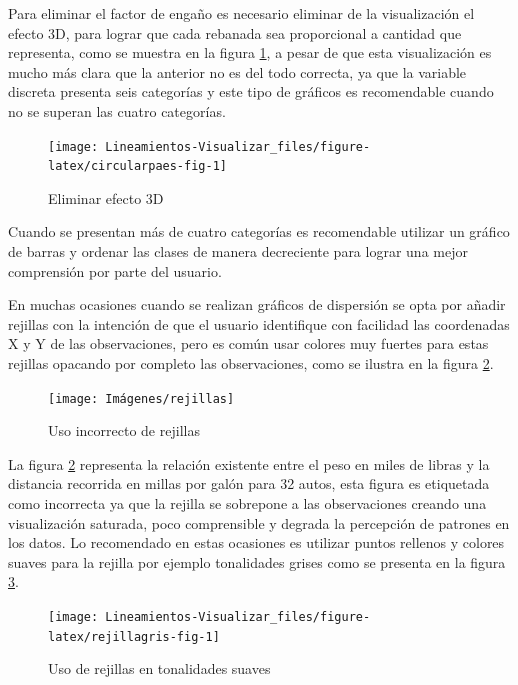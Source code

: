 \documentclass[
]{book}
\begin{document}
Para eliminar el factor de engaño es necesario eliminar de la visualización el efecto 3D, para lograr que cada rebanada sea proporcional a cantidad que representa, como se muestra en la figura \ref{fig:circularpaes-fig}, a pesar de que esta visualización es mucho más clara que la anterior no es del todo correcta, ya que la variable discreta presenta seis categorías y este tipo de gráficos es recomendable cuando no se superan las cuatro categorías.

\begin{figure}

{\centering \texttt{[image: Lineamientos-Visualizar\_files/figure-latex/circularpaes-fig-1]} 

}

\caption{Eliminar efecto 3D}\label{fig:circularpaes-fig}
\end{figure}

Cuando se presentan más de cuatro categorías es recomendable utilizar un gráfico de barras y ordenar las clases de manera decreciente para lograr una mejor comprensión por parte del usuario.

En muchas ocasiones cuando se realizan gráficos de dispersión se opta por añadir rejillas con la intención de que el usuario identifique con facilidad las coordenadas X y Y de las observaciones, pero es común usar colores muy fuertes para estas rejillas opacando por completo las observaciones, como se ilustra en la figura \ref{fig:usoderejillas-fig}.

\begin{figure}

{\centering \texttt{[image: Imágenes/rejillas]} 

}

\caption{Uso incorrecto de rejillas}\label{fig:usoderejillas-fig}
\end{figure}

La figura \ref{fig:usoderejillas-fig} representa la relación existente entre el peso en miles de libras y la distancia recorrida en millas por galón para 32 autos, esta figura es etiquetada como incorrecta ya que la rejilla se sobrepone a las observaciones creando una visualización saturada, poco comprensible y degrada la percepción de patrones en los datos. Lo recomendado en estas ocasiones es utilizar puntos rellenos y colores suaves para la rejilla por ejemplo tonalidades grises como se presenta en la figura \ref{fig:rejillagris-fig}.

\begin{figure}

{\centering \texttt{[image: Lineamientos-Visualizar\_files/figure-latex/rejillagris-fig-1]} 

}

\caption{Uso de rejillas en tonalidades suaves}\label{fig:rejillagris-fig}
\end{figure}
\end{document}
